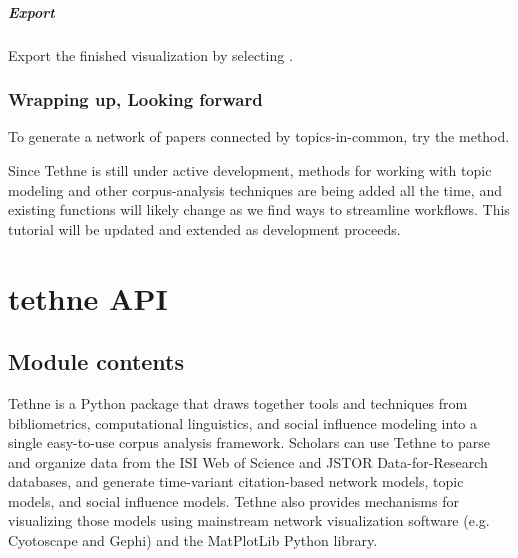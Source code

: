 \documentclass[letterpaper,10pt,english]{sphinxmanual}
\begin{document}
\subparagraph{Export}
\label{tutorial.mallet:export}
Export the finished visualization by selecting .


\subsubsection{Wrapping up, Looking forward}
\label{tutorial.mallet:wrapping-up-looking-forward}
To generate a network of papers connected by topics-in-common, try the
{\hyperref[tethne.networks.papers:tethne.networks.papers.topic_coupling]{}} method.

Since Tethne is still under active development, methods for working with topic modeling
and other corpus-analysis techniques are being added all the time, and existing functions
will likely change as we find ways to streamline workflows. This tutorial will be updated
and extended as development proceeds.


\section{tethne API}
\label{tethne::doc}\label{tethne:tethne-api}

\subsection{Module contents}
\label{tethne:module-tethne}\label{tethne:module-contents}
Tethne is a Python package that draws together tools and techniques from 
bibliometrics, computational linguistics, and social influence modeling into a
single easy-to-use corpus analysis framework. Scholars can use Tethne to parse 
and organize data from the ISI Web of Science and JSTOR Data-for-Research 
databases, and generate time-variant citation-based network models, topic 
models, and social influence models. Tethne also provides mechanisms for 
visualizing those models using mainstream network visualization software (e.g. 
Cyotoscape and Gephi) and the MatPlotLib Python library.
\end{document}
